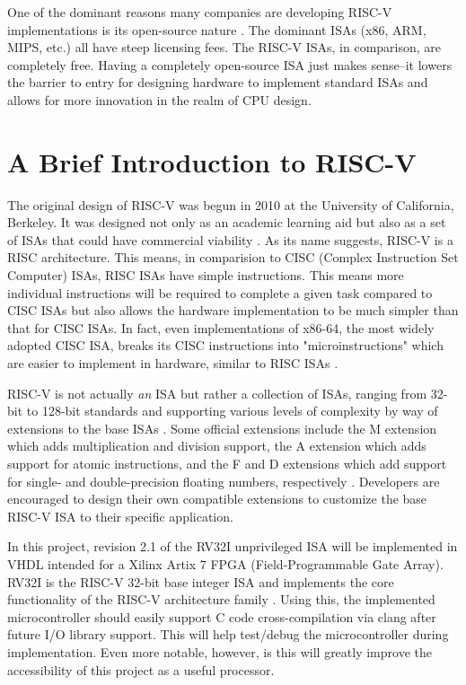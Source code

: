 \documentclass[lettersize,journal]{IEEEtran}
\begin{document}
One of the dominant reasons many companies are developing RISC-V implementations is its open-source nature \cite{riscvhistory}. 
The dominant ISAs (x86, ARM, MIPS, etc.) all have steep licensing fees.
The RISC-V ISAs, in comparison, are completely free. 
Having a completely open-source ISA just makes sense--it lowers the barrier to entry for designing hardware to implement standard 
ISAs and allows for more innovation in the realm of CPU design.  

\section{A Brief Introduction to RISC-V}
The original design of RISC-V was begun in 2010 at the University of California, Berkeley. 
It was designed not only as an academic learning aid but also as a set of ISAs that could have commercial viability \cite{riscvhistory}. 
As its name suggests, RISC-V is a RISC architecture. 
This means, in comparision to CISC (Complex Instruction Set Computer) ISAs, RISC ISAs have simple instructions. 
This means more individual instructions will be required to complete a given task compared to CISC ISAs but also allows the 
hardware implementation to be much simpler than that for CISC ISAs.
In fact, even implementations of x86-64, the most widely adopted CISC ISA, breaks its CISC instructions into "microinstructions" which are easier to implement in hardware, similar to RISC ISAs \cite{cisctorisc}.

RISC-V is not actually \textit{an} ISA but rather a collection of ISAs, 
ranging from 32-bit to 128-bit standards and supporting various levels of complexity by way of extensions to the base ISAs \cite{riscvunprovisioned}. 
Some official extensions include the M extension which adds multiplication and division support, 
the A extension which adds support for atomic instructions, and the F and D extensions which add support for single- and double-precision floating numbers, 
respectively \cite{riscvunprovisioned}. Developers are encouraged to design their own compatible extensions to customize the base RISC-V ISA to their specific application.

In this project, revision 2.1 of the RV32I unprivileged ISA will be implemented in VHDL intended for a Xilinx Artix 7 FPGA (Field-Programmable Gate Array). 
RV32I is the RISC-V 32-bit base integer ISA and implements the core functionality of the RISC-V architecture family \cite{riscvunprovisioned}.
Using this, the implemented microcontroller should easily support C code cross-compilation via clang after future I/O library support.
This will help test/debug the microcontroller during implementation.
Even more notable, however, is this will greatly improve the accessibility of this project as a useful processor.
\end{document}
